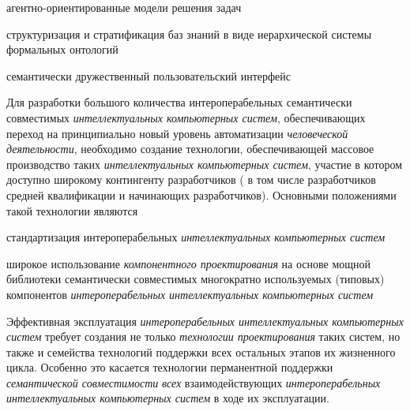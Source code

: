 \begin{textitemize}
\begin{textitemize}
		\item агентно-ориентированные модели решения задач
		\item структуризация и стратификация баз знаний в виде иерархической системы формальных онтологий
		\item семантически дружественный пользовательский интерфейс
	\end{textitemize}
	\item Для разработки большого количества интероперабельных семантически совместимых \textit{интеллектуальных компьютерных систем}, обеспечивающих переход на принципиально новый уровень автоматизации \textit{человеческой деятельности}, необходимо создание технологии, обеспечивающей массовое производство таких \textit{интеллектуальных компьютерных систем}, участие в котором доступно широкому контингенту разработчиков ( в том числе разработчиков средней квалификации и начинающих разработчиков). Основными положениями такой технологии являются
	\begin{textitemize}
		\item стандартизация интероперабельных \textit{интеллектуальных компьютерных систем}
		\item широкое использование \textit{компонентного проектирования} на основе мощной библиотеки семантически совместимых многократно используемых (типовых) компонентов \textit{интероперабельных интеллектуальных компьютерных систем}
	\end{textitemize}
	\item Эффективная эксплуатация \textit{интероперабельных интеллектуальных компьютерных систем} требует создания не только \textit{технологии проектирования} таких систем, но также и семейства технологий поддержки всех остальных этапов их жизненного цикла. Особенно это касается технологии перманентной поддержки \textit{семантической совместимости} \textit{всех} взаимодействующих \textit{интероперабельных интеллектуальных компьютерных систем} в ходе их эксплуатации.
\end{textitemize}

%